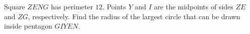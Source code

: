 Square $ZENG$ has perimeter $12$. Points $Y$ and $I$ are the midpoints of sides $ZE$ and $ZG$, respectively. Find the radius of the largest circle that can be drawn inside pentagon $GIYEN$.
